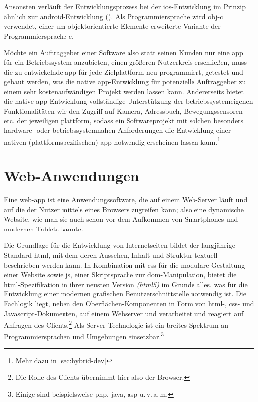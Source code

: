 Ansonsten verläuft der Entwicklungsprozess bei der \gls{ios}-Entwicklung im Prinzip ähnlich zur \gls{android}-Entwicklung ().
Als Programmiersprache wird \gls{obj-c} verwendet, einer um objektorientierte Elemente erweiterte Variante der Programmiersprache \gls{c}.

Möchte ein Auftraggeber einer Software also statt seinen Kunden nur eine \gls{app} für ein Betriebssystem anzubieten, einen größeren Nutzerkreis erschließen, muss die zu entwickelnde \gls{app} für jede Zielplattform neu programmiert, getestet und gebaut werden, was die native \gls{app}-Entwicklung für potenzielle Auftraggeber zu einem sehr kostenaufwändigen Projekt werden lassen kann.
Andererseits bietet die native \gls{app}-Entwicklung vollständige Unterstützung der betriebssystemeigenen Funktionalitäten wie den Zugriff auf Kamera, Adressbuch, Bewegungssensoren etc. der jeweiligen \gls{plattform}, sodass ein Softwareprojekt mit solchen besonders hardware- oder betriebssystemnahen Anforderungen die Entwicklung einer nativen (plattformspezifischen) \gls{app} notwendig erscheinen lassen kann.\footnote{Mehr dazu in \autoref{sec:hybrid-dev}}

\section{Web-Anwendungen}\label{sec:web-app}

Eine \gls{web-app} ist eine Anwendungssoftware, die auf einem Web-Server läuft und auf die der Nutzer mittels eines Browsers zugreifen kann; also eine dynamische Website, wie man sie auch schon vor dem Aufkommen von Smartphones und modernen Tablets kannte. 

Die Grundlage für die Entwicklung von Internetseiten bildet der langjährige Standard \gls{html}, mit dem deren Aussehen, Inhalt und Struktur textuell beschrieben werden kann. 
In Kombination mit \gls{css} für die modulare Gestaltung einer Website sowie \gls{js}, einer Skriptsprache zur \gls{dom}-Manipulation, bietet die \gls{html}-Spezifikation in ihrer neusten Version \textit{(\gls{html5})} im Grunde alles, was für die Entwicklung einer modernen grafischen Benutzerschnittstelle notwendig ist. 
Die Fachlogik liegt, neben den Oberflächen-Komponenten in Form von \mbox{\gls{html}-,} \gls{css}- und Javascript-Dokumenten, auf einem Webserver und verarbeitet und reagiert auf Anfragen des Clients.\footnote{Die Rolle des Clients übernimmt hier also der Browser.}
Als Server-Technologie ist ein breites Spektrum an Programmiersprachen und Umgebungen einsetzbar.\footnote{Einige sind beispielsweise \gls*{php}, \gls*{java}, \gls*{asp} u.\,v.\,a.\,m.}

